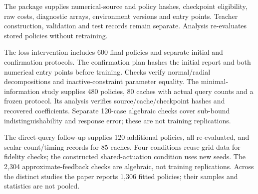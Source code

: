 The package supplies numerical-source and policy hashes, checkpoint
eligibility, raw costs, diagnostic arrays, environment versions and
entry points. Teacher construction, validation and test records remain
separate. Analysis re-evaluates stored policies without retraining.

The loss intervention includes 600 final policies and separate initial
and confirmation protocols. The confirmation plan hashes the initial
report and both numerical entry points before training. Checks verify
normal/radial decompositions and inactive-constraint parameter equality.
The minimal-information study supplies 480 policies, 80 caches with
actual query counts and a frozen protocol. Its analysis verifies
source/cache/checkpoint hashes and recovered coefficients. Separate
120-case algebraic checks cover sub-bound indistinguishability and
response error; these are not training replications.

The direct-query follow-up supplies 120 additional policies, all
re-evaluated, and scalar-count/timing records for 85 caches. Four
conditions reuse grid data for fidelity checks; the constructed
shared-actuation condition uses new seeds. The 2,304 approximate-feedback
checks are algebraic, not training replications. Across the distinct
studies the paper reports 1,306 fitted policies; their samples and
statistics are not pooled.
